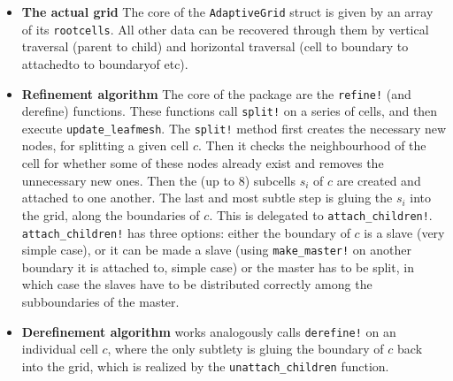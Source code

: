\documentclass{article}
\begin{document}
\begin{itemize}
    As in our implementation of the grid, cells are not erased when they are split (cf. Tree structure), instead of pointing at a set of ``small boundaries'', we can point at their common ancestor. This is realized by the \texttt{attachedto} parameter of \texttt{Element}. It is a list of elements, which we only use for boundaries of cells (i.e. not for cells themselves and not for boundaries of boundaries of cells etc.). When a cell boundary is also a boundary of the grid, its \texttt{attachedto} is empty, when it is a slave, \texttt{attachedto} points only to its master and when it is a master \texttt{attachedto} points to all of its slaves. \textcolor{red}{The attachedto interface is only kept up to date for leaves of the tree, i.e. the boundaries that are not further subdivided, for a simpler code and better performance.}\footnote{Like in a tree, where only the few outer layers are actually alive, and the inside can has only supporting functions.}
    \item {\bf The actual grid} The core of the \texttt{AdaptiveGrid} struct is given by an array of its \texttt{rootcells}. All other data can be recovered through them by vertical traversal (parent to child) and horizontal traversal (cell to boundary to attachedto to boundaryof etc). 
    \item {\bf Refinement algorithm} The core of the package are the \texttt{refine!} (and derefine) functions. These functions call \texttt{split!} on a series of cells, and then execute \texttt{update\_leafmesh}. The \texttt{split!} method first creates the necessary new nodes, for splitting a given cell $c$. Then it checks the neighbourhood of the cell for whether some of these nodes already exist and removes the unnecessary new ones. Then the (up to 8) subcells $s_i$ of $c$ are created and attached to one another. The last and most subtle step is gluing the $s_i$ into the grid, along the boundaries of $c$. This is delegated to \texttt{attach\_children!}. \texttt{attach\_children!} has three options: either the boundary of $c$ is a slave (very simple case), or it can be made a slave (using \texttt{make\_master!} on another boundary it is attached to, simple case) or the master has to be split, in which case the slaves have to be distributed correctly among the subboundaries of the master.
    \item {\bf Derefinement algorithm} works analogously calls \texttt{derefine!} on an individual cell $c$, where the only subtlety is gluing the boundary of $c$ back into the grid, which is realized by the \texttt{unattach\_children} function.
\end{itemize}
\end{document}
